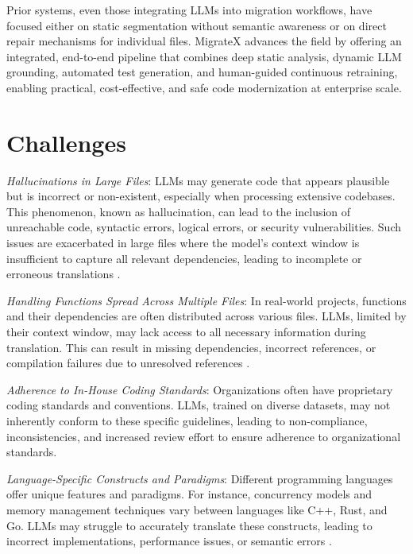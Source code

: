 \documentclass[twocolumn]{article}
\begin{document}
Prior systems, even those integrating LLMs into migration workflows, have focused either on static segmentation without semantic awareness or on direct repair mechanisms for individual files. MigrateX advances the field by offering an integrated, end-to-end pipeline that combines deep static analysis, dynamic LLM grounding, automated test generation, and human-guided continuous retraining, enabling practical, cost-effective, and safe code modernization at enterprise scale.
\endgroup

\section{Challenges}

   \textit{Hallucinations in Large Files}: LLMs may generate code that appears plausible but is incorrect or non-existent, especially when processing extensive codebases. This phenomenon, known as hallucination, can lead to the inclusion of unreachable code, syntactic errors, logical errors, or security vulnerabilities. Such issues are exacerbated in large files where the model's context window is insufficient to capture all relevant dependencies, leading to incomplete or erroneous translations \cite{window} \cite{token} \cite{levy2024same}.

   \textit{Handling Functions Spread Across Multiple Files}: In real-world projects, functions and their dependencies are often distributed across various files. LLMs, limited by their context window, may lack access to all necessary information during translation. This can result in missing dependencies, incorrect references, or compilation failures due to unresolved references \cite{eniser2024towards}.

   \textit{Adherence to In-House Coding Standards}: Organizations often have proprietary coding standards and conventions. LLMs, trained on diverse datasets, may not inherently conform to these specific guidelines, leading to non-compliance, inconsistencies, and increased review effort to ensure adherence to organizational standards.

   \textit{Language-Specific Constructs and Paradigms}: Different programming languages offer unique features and paradigms. For instance, concurrency models and memory management techniques vary between languages like C++, Rust, and Go. LLMs may struggle to accurately translate these constructs, leading to incorrect implementations, performance issues, or semantic errors \cite{zhang2023ownership}.
\end{document}
